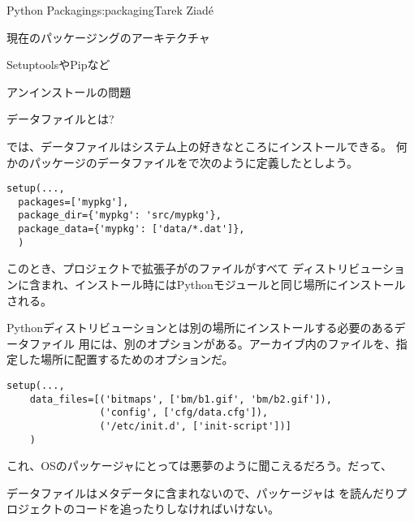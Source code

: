 \begin{aosachapter}{Python Packaging}{s:packaging}{Tarek Ziad\'{e}}
\begin{aosasect1}{現在のパッケージングのアーキテクチャ}
\begin{aosasect2}{SetuptoolsやPipなど}
\begin{aosasect3}{アンインストールの問題}
\begin{aosaitemize}
\end{aosaitemize}

\end{aosasect3}

\end{aosasect2}

\begin{aosasect2}{データファイルとは?}

では、データファイルはシステム上の好きなところにインストールできる。
何かのパッケージのデータファイルをで次のように定義したとしよう。

\begin{verbatim}
setup(...,
  packages=['mypkg'],
  package_dir={'mypkg': 'src/mypkg'},
  package_data={'mypkg': ['data/*.dat']},
  )
\end{verbatim}

\noindent
このとき、プロジェクトで拡張子がのファイルがすべて
ディストリビューションに含まれ、インストール時にはPythonモジュールと同じ場所にインストールされる。

Pythonディストリビューションとは別の場所にインストールする必要のあるデータファイル
用には、別のオプションがある。アーカイブ内のファイルを、指定した場所に配置するためのオプションだ。

\begin{verbatim}
setup(...,
    data_files=[('bitmaps', ['bm/b1.gif', 'bm/b2.gif']),
                ('config', ['cfg/data.cfg']),
                ('/etc/init.d', ['init-script'])]
    )
\end{verbatim}

\noindent
これ、OSのパッケージャにとっては悪夢のように聞こえるだろう。だって、

\begin{aosaitemize}

  \item データファイルはメタデータに含まれないので、パッケージャは
  を読んだりプロジェクトのコードを追ったりしなければいけない。


\end{aosaitemize}
\end{aosasect2}
\end{aosasect1}
\end{aosachapter}
